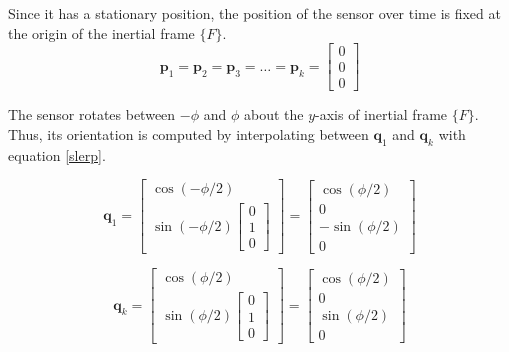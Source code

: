 Since it has a stationary position, the position of the sensor over time is fixed at the origin of the inertial frame $\{F\}$.
\begin{equation}
	\mathbf{p}_1 = \mathbf{p}_2 = \mathbf{p}_3 = \dots =  \mathbf{p}_k = 
	\begin{bmatrix}
		0 \\ 0 \\ 0
   	\end{bmatrix}
\end{equation}
										
The sensor rotates between $-\phi$ and $\phi$ about the $y$-axis of inertial frame $\{F\}$. Thus, its orientation is computed by interpolating between $\mathbf{q}_1$ and $\mathbf{q}_k$ with equation \ref{slerp}.
	
\begin{equation}
	\mathbf{q}_1 = \begin{bmatrix}
				 	\cos(-\phi/2) \\
				 	\sin(-\phi/2){\begin{bmatrix}
								 	0 \\ 1 \\ 0
							   	 \end{bmatrix}}
				 \end{bmatrix}
				 = \begin{bmatrix}
		 		   		\cos(\phi/2) \\ 0 \\ -\sin(\phi/2) \\ 0
				   \end{bmatrix}
\end{equation}

\begin{equation}
	\mathbf{q}_k = \begin{bmatrix}
				 	\cos(\phi/2) \\
				 	\sin(\phi/2){\begin{bmatrix}
								 	0 \\ 1 \\ 0
							   	 \end{bmatrix}}
				 \end{bmatrix}
				 = \begin{bmatrix}
		 		   		\cos(\phi/2) \\ 0 \\ \sin(\phi/2) \\ 0
				   \end{bmatrix}
\end{equation}

